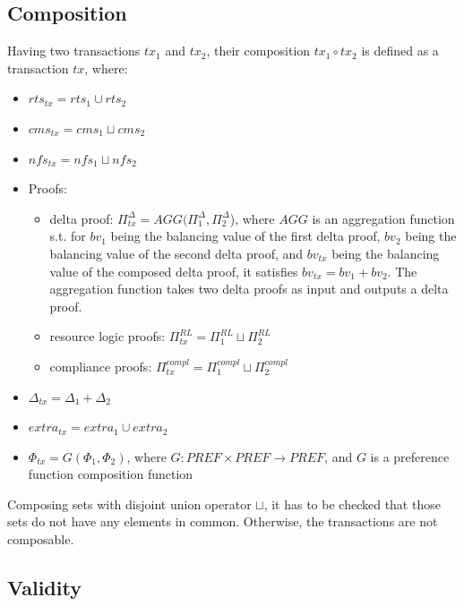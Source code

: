 \subsection{Composition}\label{tx-composition}

Having two transactions $tx_1$ and $tx_2$, their composition $tx_1 \circ tx_2$ is defined as a transaction $tx$, where:
\begin{itemize}
    \item $rts_{tx} = rts_1 \cup rts_2$
    \item $cms_{tx} = cms_1 \sqcup cms_2$
    \item $nfs_{tx} = nfs_1 \sqcup nfs_2$
    \item Proofs:
    \begin{itemize}
        \item delta proof: $\Pi^{\Delta}_{tx} = AGG(\Pi^{\Delta}_1, \Pi^{\Delta}_2$), where $AGG$ is an aggregation function s.t. for $bv_1$ being the balancing value of the first delta proof, $bv_2$ being the balancing value of the second delta proof, and $bv_{tx}$ being the balancing value of the composed delta proof, it satisfies $bv_{tx} = bv_1 + bv_2$. The aggregation function takes two delta proofs as input and outputs a delta proof.
        \item resource logic proofs: $\Pi^{RL}_{tx} = \Pi^{RL}_1 \sqcup \Pi^{RL}_2$
        \item compliance proofs: $\Pi^{compl}_{tx} = \Pi^{compl}_1 \sqcup \Pi^{compl}_2$
    \end{itemize}
    \item $\Delta_{tx} = \Delta_1 + \Delta_2$
    \item $extra_{tx} = extra_1 \cup extra_2$
    \item $\Phi_{tx} = G(\Phi_1, \Phi_2)$, where $G: PREF \times PREF \rightarrow PREF$, and $G$ is a preference function composition function
\end{itemize}

\begin{remark}
    Composing sets with disjoint union operator $\sqcup$, it has to be checked that those sets do not have any elements in common. Otherwise, the transactions are not composable.
\end{remark}


\subsection{Validity}\label{tx-validity}

